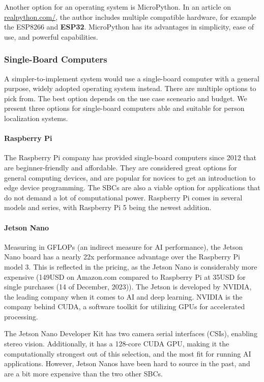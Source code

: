 Another option for an operating system is MicroPython. In an article on \href{realpython.com/micropython}{realpython.com/}, the author includes multiple compatible hardware, for example the ESP8266 and \textbf{ESP32}. MicroPython has its advantages in simplicity, ease of use, and powerful capabilities. 

\subsubsection{Single-Board Computers}
A simpler-to-implement system would use a single-board computer with a general purpose, widely adopted operating system instead. There are multiple options to pick from. The best option depends on the use case sceneario and budget. We present three options for single-board computers able and suitable for person localization systems.

\paragraph{Raspberry Pi}
The Raspberry Pi company has provided single-board computers since 2012 that are beginner-friendly and affordable. They are considered great options for general computing devices, and are popular for novices to get an introduction to edge device programming. The SBCs are also a viable option for applications that do not demand a lot of computational power. Raspberry Pi comes in several models and series, with Raspberry Pi 5 being the newest addition.  

\paragraph{Jetson Nano}
Measuring in GFLOPs (an indirect measure for AI performance), the Jetson Nano board has a nearly 22x performance advantage over the Raspberry Pi model 3. This is reflected in the pricing, as the Jetson Nano is considerably more expensive (149USD on Amazon.com compared to Raspberry Pi at 35USD for single purchases (14 of December, 2023)). The Jetson is developed by NVIDIA, the leading company when it comes to AI and deep learning. NVIDIA is the company behind CUDA, a software toolkit for utilizing GPUs for accelerated processing.

The Jetson Nano Developer Kit has two camera serial interfaces (CSIs), enabling stereo vision. Additionally, it has a 128-core CUDA GPU, making it the computationally strongest out of this selection, and the most fit for running AI applications. However, Jetson Nanos have been hard to source in the past, and are a bit more expensive than the two other SBCs.

